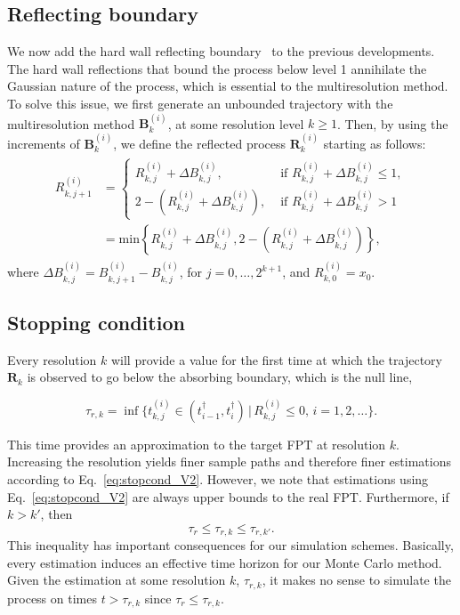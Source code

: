 \documentclass[preprint,12pt]{elsarticle}
\numberwithin{equation}{section}
\theoremstyle{plain} \newtheorem{theorem}{Theorem}[section]
\theoremstyle{plain} \newtheorem{proposition}[theorem]{Proposition}
\theoremstyle{plain} \newtheorem{lemma}[theorem]{Lemma}
\theoremstyle{plain} \newtheorem{corollary}[theorem]{Corollary}
\theoremstyle{definition} \newtheorem{definition}[theorem]{Definition}
\theoremstyle{definition} \newtheorem{notation}[theorem]{Notation}
\theoremstyle{remark} \newtheorem{remark}[theorem]{Remark}
\theoremstyle{remark} \newtheorem{remarks}[theorem]{Remarks}
\theoremstyle{remark} \newtheorem{algorithm2}[theorem]{Algorithm}
\theoremstyle{remark} \newtheorem{example}[theorem]{Example}
\begin{document}
\subsection{Reflecting boundary}\label{subsubsec:4-1-1}

We now add the hard wall reflecting boundary~\cite{redner2001guide}
to the previous developments. The hard wall reflections that bound the process below level 1 annihilate the Gaussian nature of the process, which is essential to the multiresolution method. 
To solve this issue, we first generate an unbounded trajectory with the multiresolution method $\mathbf{B}_k^{(i)}$, at some resolution 
level $k \ge 1$. 
Then, by using the increments of $\mathbf{B}_k^{(i)}$, we define the reflected process $\mathbf{R}^{(i)}_{k}$ starting as follows:
\begin{gather}\label{eq:refcond}
\begin{split}
R^{(i)}_{k,j+1} & = \begin{cases}
R^{(i)}_{k,j}+\Delta B^{(i)}_{k,j},     & \text{ if } R^{(i)}_{k,j}+\Delta B^{(i)}_{k,j} \le 1 , \\
2 - (R^{(i)}_{k,j}+\Delta B^{(i)}_{k,j}), & \text{ if } R^{(i)}_{k,j}+\Delta B^{(i)}_{k,j} > 1 
\end{cases} \\
& = \mathrm{min}\left\{ R^{(i)}_{k,j} + \Delta B^{(i)}_{k,j}, 2- (R^{(i)}_{k,j} + \Delta B^{(i)}_{k,j}) \right\},
\end{split}
\end{gather}
where $\Delta B^{(i)}_{k,j} = B^{(i)}_{k,j+1}-B_{k,j}^{(i)}$,
for $j=0,\ldots,2^{k+1}$, and $R^{(i)}_{k,0}=x_0$.

\subsection{Stopping condition}

Every resolution $k$ will provide a value for the first time  at which the trajectory $\mathbf{R}_k$ is observed to go below the absorbing boundary, which is the null line,

\begin{equation} \label{eq:stopcond_V2}
    \tau_{r,k} = \inf \{t^{(i)}_{k,j}\in(t^\dag_{i-1},t^\dag_i) \, \vert \, R^{(i)}_{k,j} \leq 0 , \, i=1,2,\dots \} .
\end{equation}

This time provides an approximation to the target FPT at resolution $k$. Increasing the resolution yields finer sample paths and therefore finer estimations according to Eq.~\eqref{eq:stopcond_V2}. However, we note that estimations using Eq.~\eqref{eq:stopcond_V2} are always upper bounds to the real FPT. Furthermore, if $k>k'$, then 
\begin{equation*}
    \tau_{r}\le\tau_{r,k}\le\tau_{r,k'}.
\end{equation*}
This inequality has important consequences for our simulation schemes. Basically, every estimation induces an effective time horizon for our Monte Carlo method. Given the estimation at some resolution $k$, $\tau_{r,k}$, it makes no sense to simulate the process on times $t>\tau_{r,k}$ since $ \tau_{r}\le\tau_{r,k}$. 
\end{document}
